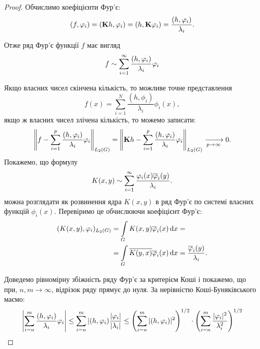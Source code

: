 \begin{proof}
    Обчислимо коефіцієнти Фур'є:
    \begin{equation}
        (f, \phi_i) = (\bf{K}h, \phi_i) = (h, \bf{K}\phi_i) = \frac{(h,\phi_i)}{\lambda_i}.
    \end{equation}

    Отже ряд Фур'є функції $f$ має вигляд 
    \begin{equation}
        f \sim \Sum_{i = 1}^\infty \dfrac{(h, \phi_i)}{\lambda_i} \phi_i
    \end{equation}

    Якщо власних чисел скінчена кількість, то можливе точне представлення 
    \begin{equation}
        f(x) = \sum_{i=1}^N \frac{(h, \phi_i)}{\lambda_i} \phi_i(x),
    \end{equation}
    якщо ж власних чисел злічена кількість, то  можемо записати:
    \begin{equation}
        \left\| f - \Sum_{i = 1}^p \dfrac{(h, \phi_i)}{\lambda_i} \phi_i \right\|_{L_2(G)} = \left\| \bf{K}h - \Sum_{i = 1}^p \dfrac{(h, \phi_i)}{\lambda_i} \phi_i \right\|_{L_2(G)} \xrightarrow[p \to \infty]{}0.
    \end{equation}
    Покажемо, що формулу 
    \begin{equation}
        K(x, y) \sim \Sum_{i = 1}^\infty \dfrac{\phi_i(x) \overline \phi_i(y)}{\lambda_i}.
    \end{equation}
    можна розглядати як розвинення ядра $K(x, y)$ в ряд Фур'є по системі власних функцій $\phi_i(x)$. Перевіримо це обчислюючи коефіцієнт Фур'є:
    \begin{equation}
        \begin{aligned}
            (K(x, y),\phi_i)_{L_2(G)} &= \Int_G K(x, y) \overline \phi_i(x) \diff x = \\
            &= \Int_G \overline {K(y, x)} \overline \phi_i(x) \diff x = \dfrac{\overline \phi_i(y)}{\lambda_i}.
        \end{aligned}
    \end{equation}

    Доведемо рівномірну збіжність ряду Фур'є за критерієм Коші і покажемо, що при, $n, m \to \infty$, відрізок ряду прямує до нуля. За нерівністю Коші-Буняківського маємо:
    \begin{equation}
        \left| \Sum_{i = n}^m \dfrac{(h, \phi_i)}{\lambda_i} \phi_i \right| \le \Sum_{i = n}^m |(h, \phi_i)\dfrac{|\phi_i|}{|\lambda_i|} \le \left(\Sum_{i=n}^m |(h, \phi_i)|^2\right)^{1/2} \cdot \left(\Sum_{i=n}^m \dfrac{|\phi_i|^2}{\lambda_i^2}\right)^{1/2}
    \end{equation}


\end{proof}

